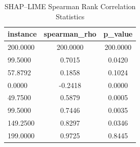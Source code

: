 \begin{table}
\centering
\caption{SHAP–LIME Spearman Rank Correlation Statistics}
\label{tab:agreement}
\begin{tabular}{lcc}
\toprule
instance & spearman_rho & p_value \\
\midrule
200.0000 & 200.0000 & 200.0000 \\
99.5000 & 0.7015 & 0.0420 \\
57.8792 & 0.1858 & 0.1024 \\
0.0000 & -0.2418 & 0.0000 \\
49.7500 & 0.5879 & 0.0005 \\
99.5000 & 0.7446 & 0.0035 \\
149.2500 & 0.8297 & 0.0346 \\
199.0000 & 0.9725 & 0.8445 \\
\bottomrule
\end{tabular}
\end{table}

